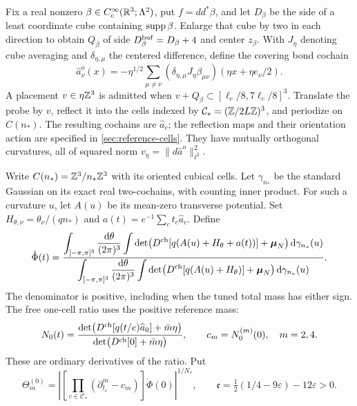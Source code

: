 Fix a real nonzero $\beta\in C_c^\infty(\mathbb R^3;\Lambda^2)$,
put $f=dd^*\beta$, and let $D_\beta$ be the side of a least
coordinate cube containing $\operatorname{supp}\beta$. Enlarge that cube by two
in each direction to obtain $Q_\beta$ of side
$D_\beta^{\rm buf}=D_\beta+4$ and center $z_\beta$.
With $J_\eta$ denoting cube averaging and $\delta_{\eta,\mu}$
the centered difference, define the covering bond cochain
\begin{equation}\label{eq:rrm-probe-definition}
 \widehat a^o_\nu(x)=
 -\eta^{1/2}\sum_{\mu\ne\nu}
 (\delta_{\eta,\mu}J_\eta\beta_{\mu\nu})
                         (\eta x+\eta e_\nu/2).
\end{equation}
A placement $v\in\eta\mathbb Z^3$ is admitted when
$v+Q_\beta\subset[\ell_c/8,7\ell_c/8]^3$.
Translate the probe by $v$, reflect it into the cells indexed by
$\mathcal C_*=(\mathbb Z/2L\mathbb Z)^3$, and periodize on $C(n_*)$.
The resulting cochains are $\widehat a_c$; the reflection maps
and their orientation action are specified in \cref{sec:reference-cells}.
They have mutually orthogonal curvatures, all of squared norm
$v_\eta=\|d\widehat a^o\|_{\ell^2}^2$.

Write $C(n_*)=\mathbb Z^3/n_*\mathbb Z^3$ with its oriented cubical cells.
Let $\gamma_{n_*}$ be the standard Gaussian on its exact real
two-cochains, with counting inner product. For such a
curvature $u$, let $A(u)$ be its mean-zero transverse potential.
Set $H_{\theta,\nu}=\theta_\nu/(qn_*)$ and
$a(t)=e^{-1}\sum_ct_c\widehat a_c$. Define
\begin{equation}\label{eq:rrm-normalized-response}
 \mathring\Phi(t)=
 \frac{\displaystyle\int_{[-\pi,\pi]^3}\frac{\mathrm d\theta}{(2\pi)^3}
       \int\det\bigl(D^{\rm ch}[q(A(u)+H_\theta+a(t))]
                         +\boldsymbol\mu_N\bigr)\,\mathrm d\gamma_{n_*}(u)}
      {\displaystyle\int_{[-\pi,\pi]^3}\frac{\mathrm d\theta}{(2\pi)^3}
       \int\det\bigl(D^{\rm ch}[q(A(u)+H_\theta)]
                         +\boldsymbol\mu_N\bigr)\,\mathrm d\gamma_{n_*}(u)}.
\end{equation}
The denominator is positive, including when the tuned total mass
has either sign. The free one-cell ratio uses the positive reference mass:
\begin{equation}\label{eq:response-free-ratio}
 N_0(t)=\frac{\det\bigl(D^{\rm ch}[q(t/e)\widehat a_0]
                                      +\bar m\eta\bigr)}
                   {\det\bigl(D^{\rm ch}[0]+\bar m\eta\bigr)},
 \qquad c_m=N_0^{(m)}(0),\quad m=2,4.
\end{equation}
These are ordinary derivatives of the ratio. Put
\[
 \Theta_m^{(0)}=
 \left|\left[\prod_{c\in\mathcal C_*}
           (\partial_{t_c}^m-c_m)\right]\mathring\Phi(0)
                                      \right|^{1/N_*},\qquad
 \mathfrak e=\tfrac12(1/4-9\varepsilon)-12\varepsilon>0.
\]

